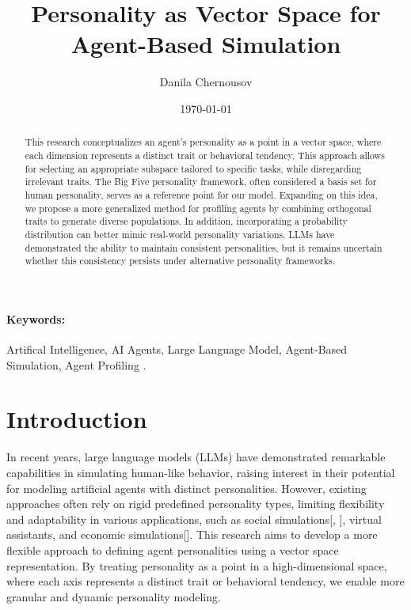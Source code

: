 \documentclass{article}
\title{Personality as Vector Space for Agent-Based Simulation}
\author{
  Danila Chernousov\\
}
\date{\today}
\begin{document}
\maketitle

\begin{abstract}
This research conceptualizes an agent's personality as a point in a vector space, where each dimension represents a distinct trait or behavioral tendency. This approach allows for selecting an appropriate subspace tailored to specific tasks, while disregarding irrelevant traits. The Big Five personality framework, often considered a basis set for human personality, serves as a reference point for our model. Expanding on this idea, we propose a more generalized method for profiling agents by combining orthogonal traits to generate diverse populations. In addition, incorporating a probability distribution can better mimic real-world personality variations. LLMs have demonstrated the ability to maintain consistent personalities, but it remains uncertain whether this consistency persists under alternative personality frameworks.

\end{abstract}

\paragraph{Keywords:} Artifical Intelligence, AI Agents, Large Language Model, Agent-Based Simulation, Agent Profiling .

\section{Introduction}
In recent years, large language models (LLMs) have demonstrated remarkable capabilities in simulating human-like behavior, raising interest in their potential for modeling artificial agents with distinct personalities. However, existing approaches often rely on rigid predefined personality types, limiting flexibility and adaptability in various applications, such as social simulations[\cite{park2024generativeagentsimulations1000}, \cite{park2023generativeagentsinteractivesimulacra}], virtual assistants, and economic simulations[\cite{Leng2024-qs}]. This research aims to develop a more flexible approach to defining agent personalities using a vector space representation. By treating personality as a point in a high-dimensional space, where each axis represents a distinct trait or behavioral tendency, we enable more granular and dynamic personality modeling.
\end{document}
